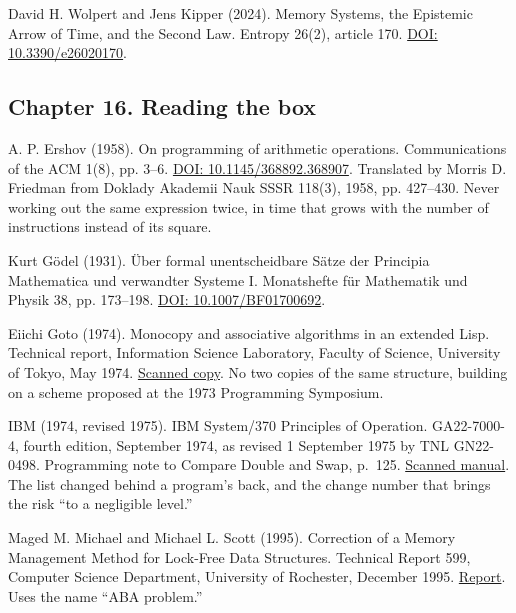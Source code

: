 \documentclass[11pt,twoside]{article}
\theoremstyle{thielethm}
\theoremstyle{thieledef}
\theoremstyle{thieledef}
\theoremstyle{thieledef}
\theoremstyle{thielethm}
\theoremstyle{thieleobs}
\theoremstyle{thielethm}
\begin{document}
\noindent David H. Wolpert and Jens Kipper (2024). Memory Systems, the Epistemic Arrow of Time, and the Second Law. Entropy 26(2), article 170. \href{https://doi.org/10.3390/e26020170}{DOI: 10.3390/e26020170}.
\par\medskip

\subsection*{Chapter 16. Reading the box}

\noindent A. P. Ershov (1958). On programming of arithmetic operations. Communications of the ACM 1(8), pp. 3--6. \href{https://doi.org/10.1145/368892.368907}{DOI: 10.1145/368892.368907}. Translated by Morris D. Friedman from Doklady Akademii Nauk SSSR 118(3), 1958, pp. 427--430. Never working out the same expression twice, in time that grows with the number of instructions instead of its square.
\par\medskip

\noindent Kurt G\"odel (1931). \"Uber formal unentscheidbare S\"atze der Principia Mathematica und verwandter Systeme I. Monatshefte f\"ur Mathematik und Physik 38, pp. 173--198. \href{https://doi.org/10.1007/BF01700692}{DOI: 10.1007/BF01700692}.
\par\medskip

\noindent Eiichi Goto (1974). Monocopy and associative algorithms in an extended Lisp. Technical report, Information Science Laboratory, Faculty of Science, University of Tokyo, May 1974. \href{https://www.cs.utexas.edu/~hunt/research/hash-cons/hash-cons-papers/monocopy-goto.pdf}{Scanned copy}. No two copies of the same structure, building on a scheme proposed at the 1973 Programming Symposium.
\par\medskip

\noindent IBM (1974, revised 1975). IBM System/370 Principles of Operation. GA22-7000-4, fourth edition, September 1974, as revised 1 September 1975 by TNL GN22-0498. Programming note to Compare Double and Swap, p.~125. \href{https://ftp.mirrorservice.org/sites/www.bitsavers.org/pdf/ibm/370/princOps/GA22-7000-4_370_Principles_Of_Operation_Sep75.pdf}{Scanned manual}. The list changed behind a program's back, and the change number that brings the risk ``to a negligible level.''
\par\medskip

\noindent Maged M. Michael and Michael L. Scott (1995). Correction of a Memory Management Method for Lock-Free Data Structures. Technical Report 599, Computer Science Department, University of Rochester, December 1995. \href{https://www.cs.rochester.edu/u/scott/papers/1995_TR599.pdf}{Report}. Uses the name ``ABA problem.''
\par\medskip
\end{document}
